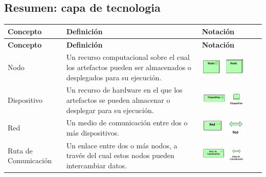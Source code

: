 \subsection{Resumen: capa de tecnologia}
\begin{center}
\begin{longtable}[H]{| >{\centering\arraybackslash}m{3cm} | >{\arraybackslash}m{6cm} | p{4cm} | p{5cm} | p{4cm} |}
	
		\hline
		\textbf{Concepto} &  \centering \textbf{Definición} & \textbf{Notación} \\
		\hline
		\endfirsthead
		
		
		\hline
		\textbf{Concepto} &  \centering \textbf{Definición} & \textbf{Notación} \\
		\hline
		\endhead
		
		Nodo        
		& \vspace{1mm} Un recurso computacional sobre el cual 
		los artefactos pueden ser almacenados o
		desplegados para su ejecución.        
		&\includegraphics[width=30mm,trim=0 0 0 -2mm]{imagenes/lenguaje/tecnologia/nodo}  \\ \hline
		
		Dispositivo 
		& \vspace{1mm} Un recurso de hardware en el que los
		artefactos se pueden almacenar o desplegar 
		para su ejecución.              
		& \includegraphics[width=35mm,trim=0 0 0 -2mm]{imagenes/lenguaje/tecnologia/dispositivo}  \\ \hline
		
		Red         
		&\vspace{1mm} Un medio de comunicación entre dos o
		más dispositivos.               
		& \includegraphics[width=25mm,trim=0 0 0 -2mm]{imagenes/lenguaje/tecnologia/red}  \\ \hline
		
		Ruta de 
		Comunicación	
		& \vspace{1mm} Un enlace entre dos o más nodos, a
		través del cual estos nodos pueden 
		intercambiar datos.                
		& \includegraphics[width=35mm,trim=0 0 0 -2mm]{imagenes/lenguaje/tecnologia/comunicacion}  \\ \hline
		

\end{longtable}
\end{center}
